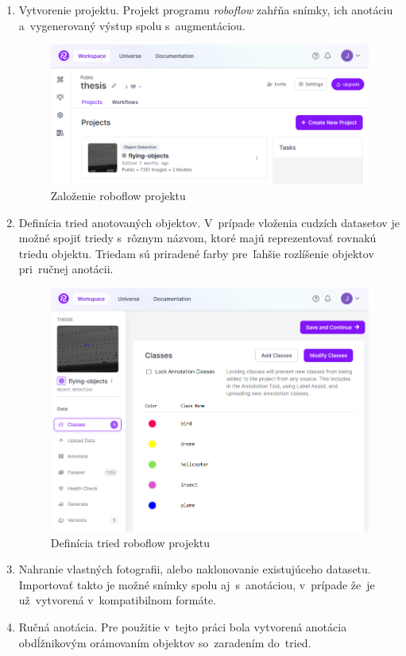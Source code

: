         \begin{enumerate}
            \item Vytvorenie projektu. Projekt programu \emph{roboflow} zahŕňa snímky, ich anotáciu a~vygenerovaný výstup spolu s~augmentáciou.

            \begin{figure}[H]
                \centering
                \includegraphics[width=.5\textwidth]{obrazky/roboflow/projects.png}
                \caption{Založenie roboflow projektu}
            \end{figure}

            \item Definícia tried anotovaných objektov. V~prípade vloženia cudzích datasetov je možné spojiť triedy s~rôznym názvom, ktoré majú reprezentovať rovnakú triedu objektu. Triedam sú priradené farby pre~ľahšie rozlíšenie objektov pri~ručnej anotácii.

            \begin{figure}[H]
                \centering
                \includegraphics[width=.5\textwidth]{obrazky/roboflow/classes edit.png}
                \caption{Definícia tried roboflow projektu}
            \end{figure}

            \item Nahranie vlastných fotografii, alebo naklonovanie existujúceho datasetu. Importovať takto je možné snímky spolu aj~s~anotáciou, v~prípade že~je už~vytvorená v~kompatibilnom formáte.

            \item Ručná anotácia. Pre použitie v~tejto práci bola vytvorená anotácia obdĺžnikovým orámovaním objektov so~zaradením do~tried.


\end{enumerate}
